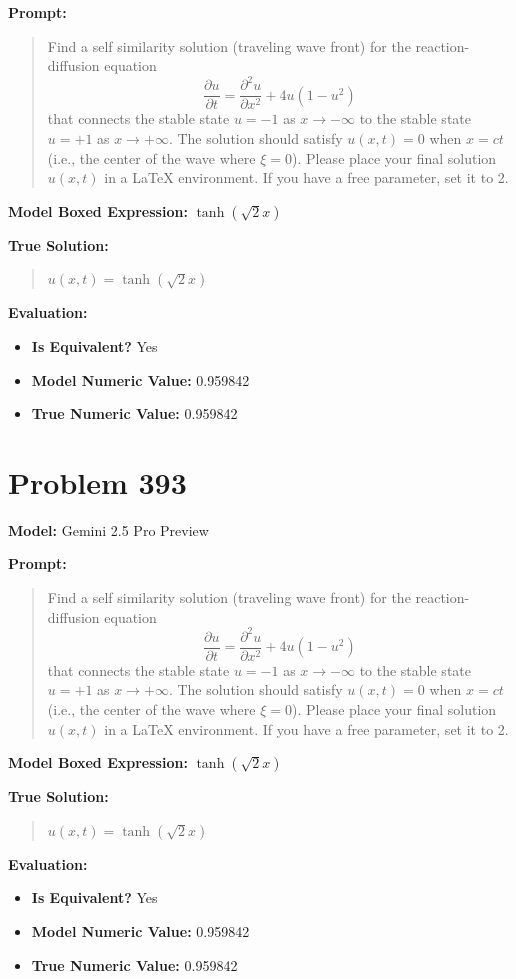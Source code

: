 \documentclass{article}
\begin{document}
{\textbf{Prompt:}
\begin{quote}
Find a self similarity solution (traveling wave front) for the reaction-diffusion equation $$ \frac{\partial u}{\partial t} = \frac{\partial^2 u}{\partial x^2} + 4u(1 - u^2) $$ that connects the stable state $u=-1$ as $x \to -\infty$ to the stable state $u=+1$ as $x \to +\infty$. The solution should satisfy $u(x,t) = 0$ when $x=ct$ (i.e., the center of the wave where $\xi=0$). Please place your final solution $u(x,t)$ in a \boxed{} LaTeX environment. If you have a free parameter, set it to 2.
\end{quote}
\textbf{Model Boxed Expression:} $\tanh(\sqrt{2}x)$

\textbf{True Solution:}
\begin{quote}
$u(x,t) = \tanh(\sqrt{2} x)$
\end{quote}

\textbf{Evaluation:}
\begin{itemize}
\item \textbf{Is Equivalent?} Yes
\item \textbf{Model Numeric Value:} 0.959842
\item \textbf{True Numeric Value:} 0.959842
\end{itemize}
\vspace{1cm}
\section*{Problem 393}
\textbf{Model:} Gemini 2.5 Pro Preview

\textbf{Prompt:}
\begin{quote}
Find a self similarity solution (traveling wave front) for the reaction-diffusion equation $$ \frac{\partial u}{\partial t} = \frac{\partial^2 u}{\partial x^2} + 4u(1 - u^2) $$ that connects the stable state $u=-1$ as $x \to -\infty$ to the stable state $u=+1$ as $x \to +\infty$. The solution should satisfy $u(x,t) = 0$ when $x=ct$ (i.e., the center of the wave where $\xi=0$). Please place your final solution $u(x,t)$ in a \boxed{} LaTeX environment. If you have a free parameter, set it to 2.
\end{quote}
\textbf{Model Boxed Expression:} $\tanh(\sqrt{2}x)$

\textbf{True Solution:}
\begin{quote}
$u(x,t) = \tanh(\sqrt{2} x)$
\end{quote}

\textbf{Evaluation:}
\begin{itemize}
\item \textbf{Is Equivalent?} Yes
\item \textbf{Model Numeric Value:} 0.959842
\item \textbf{True Numeric Value:} 0.959842
\end{itemize}
\vspace{1cm}
}
\end{document}
